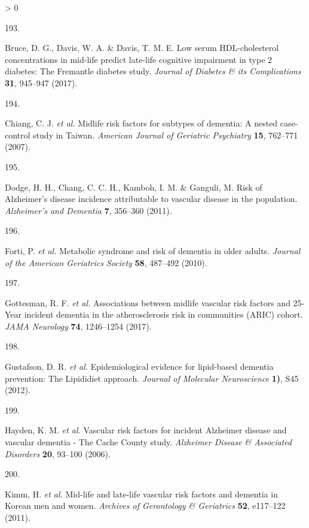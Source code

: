 \documentclass[a4paper, twoside]{templates/ociamthesis}
\newlength{\cslhangindent}
\newlength{\csllabelwidth}
\newenvironment{CSLReferences}[3] %
 {%
  \setlength{\parindent}{0pt}
  \ifodd #1 \everypar{\setlength{\hangindent}{\cslhangindent}}\ignorespaces\fi
  \ifnum #2 > 0
  \setlength{\parskip}{#2\baselineskip}
  \fi
 }%
 {}
\newcommand{\CSLLeftMargin}[1]{\parbox[t]{\maxof{\widthof{#1}}{\csllabelwidth}}{#1}}
\newcommand{\CSLRightInline}[1]{\parbox[t]{\linewidth - \csllabelwidth}{#1}}
\begin{document}
\begin{CSLReferences}{0}{0}
\leavevmode\hypertarget{ref-bruce2017}{}%
\CSLLeftMargin{193. }
\CSLRightInline{Bruce, D. G., Davis, W. A. \& Davis, T. M. E. Low serum {HDL}-cholesterol concentrations in mid-life predict late-life cognitive impairment in type 2 diabetes: The {Fremantle} diabetes study. \emph{Journal of Diabetes \& its Complications} \textbf{31}, 945--947 (2017).}

\leavevmode\hypertarget{ref-chiang2007}{}%
\CSLLeftMargin{194. }
\CSLRightInline{Chiang, C. J. \emph{et al.} Midlife risk factors for subtypes of dementia: A nested case-control study in {Taiwan}. \emph{American Journal of Geriatric Psychiatry} \textbf{15}, 762--771 (2007).}

\leavevmode\hypertarget{ref-dodge2011}{}%
\CSLLeftMargin{195. }
\CSLRightInline{Dodge, H. H., Chang, C. C. H., Kamboh, I. M. \& Ganguli, M. Risk of {Alzheimer}'s disease incidence attributable to vascular disease in the population. \emph{Alzheimer's and Dementia} \textbf{7}, 356--360 (2011).}

\leavevmode\hypertarget{ref-forti2010}{}%
\CSLLeftMargin{196. }
\CSLRightInline{Forti, P. \emph{et al.} Metabolic syndrome and risk of dementia in older adults. \emph{Journal of the American Geriatrics Society} \textbf{58}, 487--492 (2010).}

\leavevmode\hypertarget{ref-gottesman2017}{}%
\CSLLeftMargin{197. }
\CSLRightInline{Gottesman, R. F. \emph{et al.} Associations between midlife vascular risk factors and 25-{Year} incident dementia in the atherosclerosis risk in communities ({ARIC}) cohort. \emph{JAMA Neurology} \textbf{74}, 1246--1254 (2017).}

\leavevmode\hypertarget{ref-gustafson2012}{}%
\CSLLeftMargin{198. }
\CSLRightInline{Gustafson, D. R. \emph{et al.} Epidemiological evidence for lipid-based dementia prevention: The {Lipididiet} approach. \emph{Journal of Molecular Neuroscience} \textbf{1)}, S45 (2012).}

\leavevmode\hypertarget{ref-hayden2006}{}%
\CSLLeftMargin{199. }
\CSLRightInline{Hayden, K. M. \emph{et al.} Vascular risk factors for incident {Alzheimer} disease and vascular dementia - {The Cache County} study. \emph{Alzheimer Disease \& Associated Disorders} \textbf{20}, 93--100 (2006).}

\leavevmode\hypertarget{ref-kimm2011}{}%
\CSLLeftMargin{200. }
\CSLRightInline{Kimm, H. \emph{et al.} Mid-life and late-life vascular risk factors and dementia in {Korean} men and women. \emph{Archives of Gerontology \& Geriatrics} \textbf{52}, e117--122 (2011).}


\end{CSLReferences}
\end{document}
